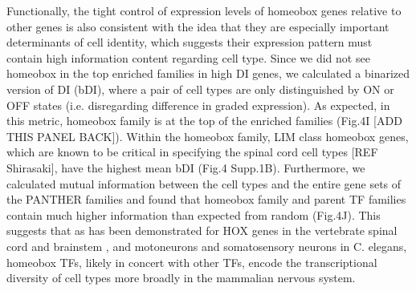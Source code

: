 Functionally, the tight control of expression levels of homeobox genes relative to other genes is also consistent with the idea that they are especially important determinants of cell identity, which suggests their expression pattern must contain high information content regarding cell type. Since we did not see homeobox in the top enriched families in high DI genes, we calculated a binarized version of DI (bDI), where a pair of cell types are only distinguished by ON or OFF states (i.e. disregarding difference in graded expression). As expected, in this metric, homeobox family is at the top of the enriched families (Fig.4I [ADD THIS PANEL BACK]). Within the homeobox family, LIM class homeobox genes, which are known to be critical in specifying the spinal cord cell types [REF Shirasaki], have the highest mean bDI (Fig.4 Supp.1B). Furthermore, we calculated mutual information between the cell types and the entire gene sets of the PANTHER families and found that homeobox family and parent TF families contain much higher information than expected from random (Fig.4J). This suggests that as has been demonstrated for HOX genes in the vertebrate spinal cord and brainstem \cite{Dasen_2009,Philippidou_2013}, and motoneurons \cite{Kratsios_2017} and somatosensory neurons \cite{Zheng_2015} in C. elegans, homeobox TFs, likely in concert with other TFs, encode the transcriptional diversity of cell types more broadly in the mammalian nervous system.
